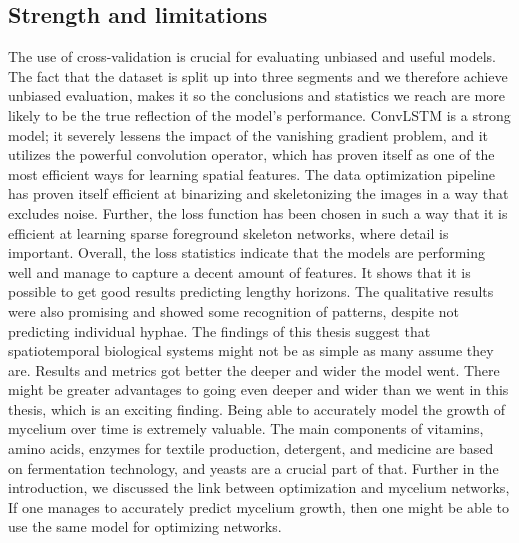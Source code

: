 \documentclass[a4paper,12pt]{article}
\begin{document}
\subsection{Strength and limitations}
The use of cross-validation is crucial for evaluating unbiased and useful models. The fact that the dataset is split up into three segments and we therefore achieve unbiased evaluation, makes it so the conclusions and statistics we reach are more likely to be the true reflection of the model's performance.
ConvLSTM is a strong model; it severely lessens the impact of the vanishing gradient problem, and it utilizes the powerful convolution operator, which has proven itself as one of the most efficient ways for learning spatial features. The data optimization pipeline has proven itself efficient at binarizing and skeletonizing the images in a way that excludes noise. Further, the loss function has been chosen in such a way that it is efficient at learning sparse foreground skeleton networks, where detail is important.
Overall, the loss statistics indicate that the models are performing well and manage to capture a decent amount of features. It shows that it is possible to get good results predicting lengthy horizons. The qualitative results were also promising and showed some recognition of patterns, despite not predicting individual hyphae.
The findings of this thesis suggest that spatiotemporal biological systems might not be as simple as many assume they are. Results and metrics got better the deeper and wider the model went. There might be greater advantages to going even deeper and wider than we went in this thesis, which is an exciting finding.
Being able to accurately model the growth of mycelium over time is extremely valuable. The main components of vitamins, amino acids, enzymes for textile production, detergent, and medicine are based on fermentation technology, and yeasts are a crucial part of that. Further in the introduction, we discussed the link between optimization and mycelium networks, If one manages to accurately predict mycelium growth, then one might be able to use the same model for optimizing networks.
\end{document}
